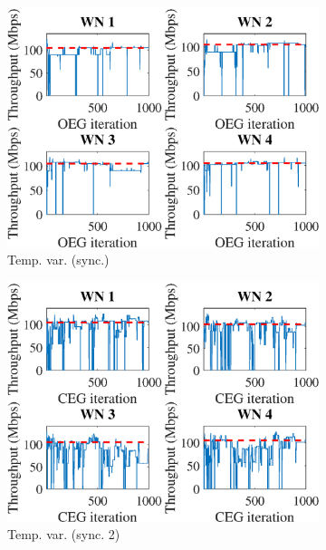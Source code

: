 \documentclass[preprint,12pt]{article}
\begin{document}
\begin{figure}[h!]
\begin{subfigure}[b]{.3\textwidth}
		\includegraphics[width=\textwidth]{images/temporal_individual_tpt_OEG}
		\caption{Temp. var.  (sync.)}\label{fig:temporal_individual_tpt_OEG}
	\end{subfigure}
	\begin{subfigure}[b]{.3\textwidth}
		\includegraphics[width=\textwidth]{images/temporal_individual_tpt_CEG}
		\caption{Temp. var.  (sync. 2)}\label{fig:temporal_individual_tpt_CEG}
	\end{subfigure}\\
	\begin{subfigure}[b]{.3\textwidth}

\end{subfigure}
\end{figure}
\end{document}
